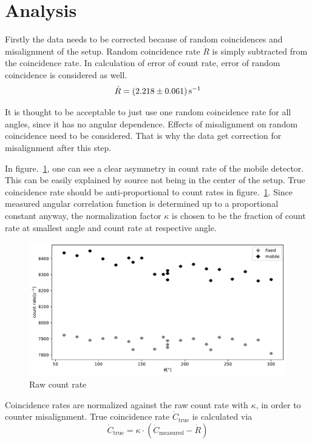 \section{Analysis}
Firstly the data needs to be corrected because of random coincidences and misalignment of the setup. Random coincidence rate $\dot{R}$ is simply subtracted from the coincidence rate. In calculation of error of count rate, error of random coincidence is considered as well.
\begin{equation}
   \dot{R} = \SI{2.218 +- 0.061}{\per\s}
\end{equation}

It is thought to be acceptable to just use one random coincidence rate for all angles, since it has no angular dependence. Effects of misalignment on random coincidence need to be considered. That is why the data get correction for misalignment after this step.

In figure.~\ref{fig:countRate}, one can see a clear asymmetry in count rate of the mobile detector. This can be easily explained by source not being in the center of the setup. True coincidence rate should be anti-proportional to count rates in figure.~\ref{fig:countRate}. Since measured angular correlation function is determined up to a proportional constant anyway, the normalization factor $\kappa$ is chosen to be the fraction of count rate at smallest angle and count rate at respective angle.
\begin{figure}[ht]
   \centering
   \includegraphics[width=0.8\linewidth]{./figs/countRate.pdf}
   \caption{Raw count rate}%
   \label{fig:countRate}
\end{figure}

Coincidence rates are normalized against the raw count rate with $\kappa$, in order to counter misalignment. True coincidence rate $\dot{C}_{\text{true}}$ is calculated via
\begin{equation}
   \dot{C}_\text{true} = \kappa \cdot ( \dot{C}_\text{measured} - \dot{R})
\end{equation}

